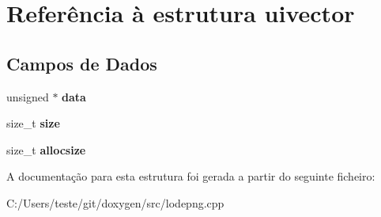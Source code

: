 \hypertarget{structuivector}{\section{Referência à estrutura uivector}
\label{structuivector}
}
\subsection*{Campos de Dados}
\begin{DoxyCompactItemize}
\item 
\hypertarget{structuivector_a609a4dbd688f2fcfc019d9c728435c69}{unsigned $\ast$ {\bfseries data}}\label{structuivector_a609a4dbd688f2fcfc019d9c728435c69}

\item 
\hypertarget{structuivector_a854352f53b148adc24983a58a1866d66}{size\-\_\-t {\bfseries size}}\label{structuivector_a854352f53b148adc24983a58a1866d66}

\item 
\hypertarget{structuivector_a5a20ebbe2e7f1b4cdaafb193b7a4a6a0}{size\-\_\-t {\bfseries allocsize}}\label{structuivector_a5a20ebbe2e7f1b4cdaafb193b7a4a6a0}

\end{DoxyCompactItemize}


A documentação para esta estrutura foi gerada a partir do seguinte ficheiro\-:\begin{DoxyCompactItemize}
\item 
C\-:/\-Users/teste/git/doxygen/src/lodepng.\-cpp\end{DoxyCompactItemize}
